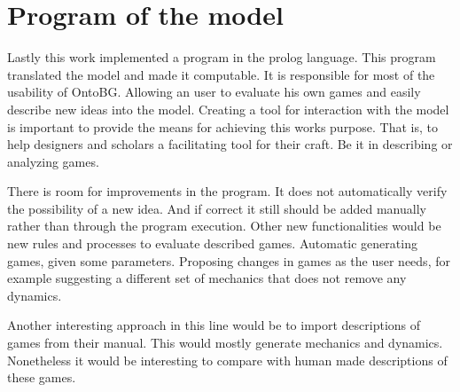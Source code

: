 \section{Program of the model}

Lastly this work implemented a program in the prolog language. This program translated the model and made it computable. It is responsible for most of the usability of OntoBG. Allowing an user to evaluate his own games and easily describe new ideas into the model. Creating a tool for interaction with the model is important to provide the means for achieving this works purpose. That is, to help designers and scholars a facilitating tool for their craft. Be it in describing or analyzing games.

There is room for improvements in the program. It does not automatically verify the possibility of a new idea. And if correct it still should be added manually rather than through the program execution. Other new functionalities would be new rules and processes to evaluate described games. Automatic generating games, given some parameters. Proposing changes in games as the user needs, for example suggesting a different set of mechanics that does not remove any dynamics.

Another interesting approach in this line would be to import descriptions of games from their manual. This would mostly generate mechanics and dynamics. Nonetheless it would be interesting to compare with human made descriptions of these games.